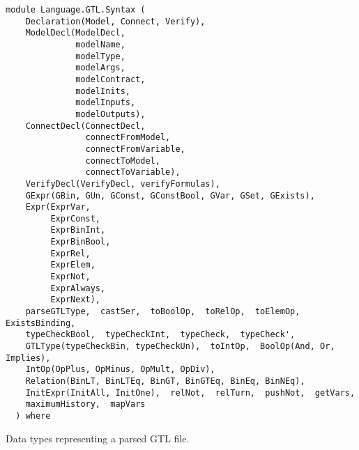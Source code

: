 \label{module:Language.GTL.Syntax}
\haddockbeginheader
{\haddockverb\begin{verbatim}
module Language.GTL.Syntax (
    Declaration(Model, Connect, Verify), 
    ModelDecl(ModelDecl,
              modelName,
              modelType,
              modelArgs,
              modelContract,
              modelInits,
              modelInputs,
              modelOutputs), 
    ConnectDecl(ConnectDecl,
                connectFromModel,
                connectFromVariable,
                connectToModel,
                connectToVariable), 
    VerifyDecl(VerifyDecl, verifyFormulas), 
    GExpr(GBin, GUn, GConst, GConstBool, GVar, GSet, GExists), 
    Expr(ExprVar,
         ExprConst,
         ExprBinInt,
         ExprBinBool,
         ExprRel,
         ExprElem,
         ExprNot,
         ExprAlways,
         ExprNext), 
    parseGTLType,  castSer,  toBoolOp,  toRelOp,  toElemOp,  ExistsBinding, 
    typeCheckBool,  typeCheckInt,  typeCheck,  typeCheck', 
    GTLType(typeCheckBin, typeCheckUn),  toIntOp,  BoolOp(And, Or, Implies), 
    IntOp(OpPlus, OpMinus, OpMult, OpDiv), 
    Relation(BinLT, BinLTEq, BinGT, BinGTEq, BinEq, BinNEq), 
    InitExpr(InitAll, InitOne),  relNot,  relTurn,  pushNot,  getVars, 
    maximumHistory,  mapVars
  ) where\end{verbatim}}
\haddockendheader

Data types representing a parsed GTL file.
\par


